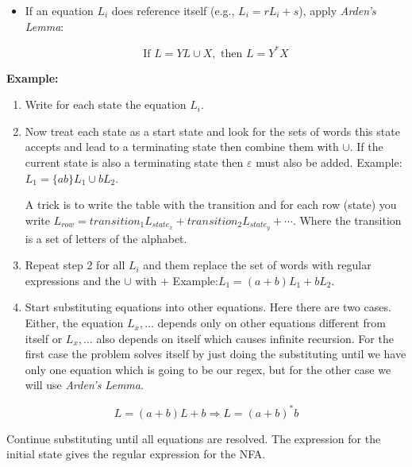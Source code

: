 \begin{enumerate}
\begin{itemize}
        \item If an equation \(L_i\) does reference itself (e.g., \(L_i = r L_i + s\)), apply 
        \emph{Arden's Lemma}:  
        
        \[
            \text{If } L = YL \cup X, \text{ then } L = Y^*X
        \]
    
    \end{itemize}

    \textbf{Example:}  \begin{enumerate}
    
    \item Write for each state the equation \(L_i\).
    
    \item Now treat each state as a start state and look for the sets of words this state accepts and lead 
          to a terminating state then combine them with \(\cup\). If the current state is also a terminating 
          state then \(\varepsilon\) must also be added. Example: \(L_1 = \{ab\}L_1 \cup b L_2\).

          A trick is to write the table with the transition and for each row (state) you write 
          \(L_{row} = transition_1 L_{state_x} + transition_2 L_{state_y} + \cdots \). Where the transition is 
          a set of letters of the alphabet.
          
    \item Repeat step 2 for all \(L_i\) and them replace the set of words with regular expressions and the 
           \(\cup\) with \(+\) Example:\(L_1 = (a+b)L_1 + b L_2\).
    
    \item Start substituting equations into other equations. Here there are two cases. Either, the  
          equation \(L_x, \dots\) depends only on other equations different from itself or  \(L_x, \dots\) also depends on 
          itself which causes infinite recursion. For the first case the problem solves itself by just 
          doing the substituting until we have only one equation which is going to be our regex, but for the 
          other case we will use \emph{Arden's Lemma}. 

\end{enumerate}

    \[
        L = (a + b) L + b \Rightarrow L = (a + b)^* b
    \]

    Continue substituting until all equations are resolved. The expression for the initial state gives 
    the regular expression for the NFA.

\end{enumerate}


